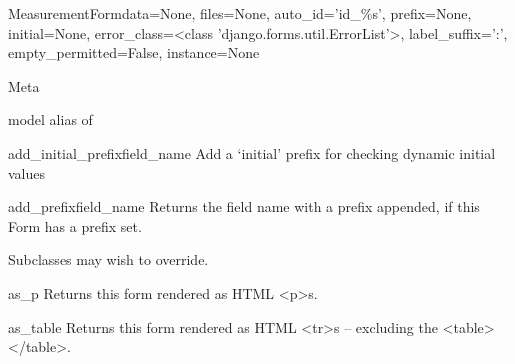 \documentclass[letterpaper,10pt,english]{sphinxmanual}
\begin{document}
\hypertarget{data.forms.MeasurementForm}{}\begin{classdesc}{MeasurementForm}{data=None, files=None, auto\_id='id\_\%s', prefix=None, initial=None, error\_class=\textless{}class 'django.forms.util.ErrorList'\textgreater{}, label\_suffix=':', empty\_permitted=False, instance=None}~

\hypertarget{data.forms.MeasurementForm.Meta}{}\begin{classdesc}{Meta}{}~

\hypertarget{data.forms.MeasurementForm.Meta.model}{}\begin{memberdesc}{model}
alias of 
\end{memberdesc}
\end{classdesc}

\hypertarget{data.forms.MeasurementForm.add_initial_prefix}{}\begin{methoddesc}[MeasurementForm]{add\_initial\_prefix}{field\_name}
Add a `initial' prefix for checking dynamic initial values
\end{methoddesc}

\hypertarget{data.forms.MeasurementForm.add_prefix}{}\begin{methoddesc}[MeasurementForm]{add\_prefix}{field\_name}
Returns the field name with a prefix appended, if this Form has a
prefix set.

Subclasses may wish to override.
\end{methoddesc}

\hypertarget{data.forms.MeasurementForm.as_p}{}\begin{methoddesc}[MeasurementForm]{as\_p}{}
Returns this form rendered as HTML \textless{}p\textgreater{}s.
\end{methoddesc}

\hypertarget{data.forms.MeasurementForm.as_table}{}\begin{methoddesc}[MeasurementForm]{as\_table}{}
Returns this form rendered as HTML \textless{}tr\textgreater{}s -- excluding the \textless{}table\textgreater{}\textless{}/table\textgreater{}.
\end{methoddesc}


\end{classdesc}
\end{document}
